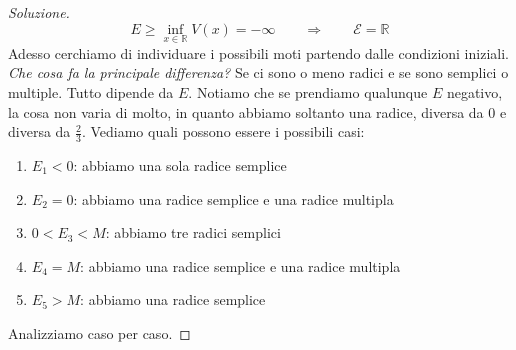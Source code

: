 \documentclass[11pt,a4paper,twoside]{article}
\theoremstyle{definition}
\newenvironment{sol}
	{\renewcommand\qedsymbol{$\blacksquare$}\begin{proof}[Soluzione]}
	{\end{proof}}
\begin{document}
\begin{sol}
	\[ E \geq \inf_{x \in \mathbb R} V(x) = - \infty \qquad \Rightarrow \qquad \mathscr E = \mathbb R \]
	Adesso cerchiamo di individuare i possibili moti partendo dalle condizioni iniziali.\\
	\textit{Che cosa fa la principale differenza?} Se ci sono o meno radici e se sono semplici o multiple. Tutto dipende da $E$. Notiamo che se prendiamo qualunque $E$ negativo, la cosa non varia di molto, in quanto abbiamo soltanto una radice, diversa da $0$ e diversa da $\frac 23$. Vediamo quali possono essere i possibili casi:
	\begin{enumerate}
		\item $E_1<0$: abbiamo una sola radice semplice
		\item $E_2=0$: abbiamo una radice semplice e una radice multipla
		\item $0<E_3<M$: abbiamo tre radici semplici
		\item $E_4=M$: abbiamo una radice semplice e una radice multipla
		\item $E_5>M$: abbiamo una radice semplice
	\end{enumerate}
	Analizziamo caso per caso.


\end{sol}
\end{document}
